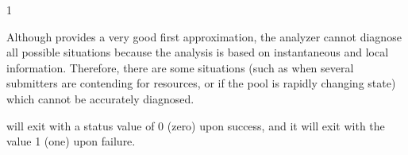 \begin{ManPage}{\label{man-condor-analyze}}{1}
\begin{Options}
\end{Options}

\GenRem
Although  provides a very good first approximation,
the analyzer 
cannot diagnose all possible situations because the analysis is based on 
instantaneous and local information.  Therefore, there are some situations 
(such as when several submitters are contending for resources, or if the pool 
is rapidly changing state) which cannot be accurately diagnosed.

\Examples

\ExitStatus

 will exit with a status value of 0 (zero) upon success,
and it will exit with the value 1 (one) upon failure.

\end{ManPage}
